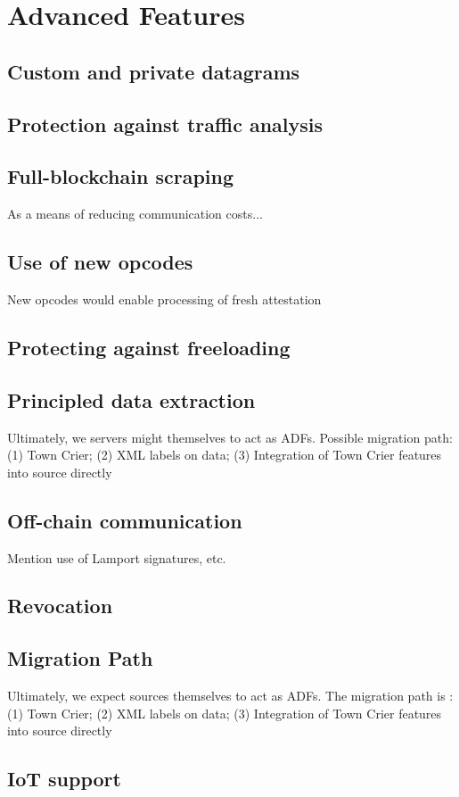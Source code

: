 \section{Advanced Features}
\subsection{Custom and private datagrams}
\subsection{Protection against traffic analysis}
\subsection{Full-blockchain scraping}
As a means of reducing communication costs...
\subsection{Use of new opcodes}
New opcodes would enable processing of fresh attestation
\subsection{Protecting against freeloading}
\subsection{Principled data extraction}
Ultimately, we servers might themselves to act as ADFs. Possible migration path: (1) Town Crier; (2) XML labels on data; (3) Integration of Town Crier features into source directly
\subsection{Off-chain communication}
Mention use of Lamport signatures, etc.
\subsection{Revocation}
\subsection{Migration Path}
Ultimately, we expect sources themselves to act as ADFs. The migration path is : (1) Town Crier; (2) XML labels on data; (3) Integration of Town Crier features into source directly
\subsection{IoT support}

